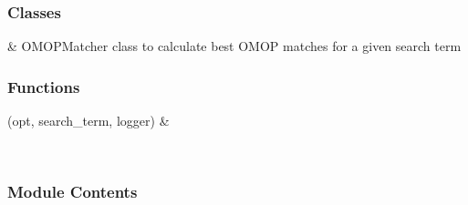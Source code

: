 \documentclass[letterpaper,10pt,english]{sphinxmanual}
\begin{document}
\subsubsection{Classes}
\label{\detokenize{autoapi/OMOP_match/index:classes}}

\begin{savenotes}\sphinxattablestart
\sphinxthistablewithglobalstyle
\sphinxthistablewithnovlinesstyle
\centering
\begin{tabulary}{\linewidth}[t]{}
\sphinxtoprule
\sphinxtableatstartofbodyhook
\sphinxAtStartPar
{}
&
\sphinxAtStartPar
OMOPMatcher class to calculate best OMOP matches for a given search term
\\
\sphinxbottomrule
\end{tabulary}
\sphinxtableafterendhook\par
\sphinxattableend\end{savenotes}


\subsubsection{Functions}
\label{\detokenize{autoapi/OMOP_match/index:functions}}

\begin{savenotes}\sphinxattablestart
\sphinxthistablewithglobalstyle
\sphinxthistablewithnovlinesstyle
\centering
\begin{tabulary}{\linewidth}[t]{}
\sphinxtoprule
\sphinxtableatstartofbodyhook
\sphinxAtStartPar
{}(opt, search\_term, logger)
&
\sphinxAtStartPar

\\
\sphinxbottomrule
\end{tabulary}
\sphinxtableafterendhook\par
\sphinxattableend\end{savenotes}


\subsubsection{Module Contents}
\label{\detokenize{autoapi/OMOP_match/index:module-contents}}
\end{document}
